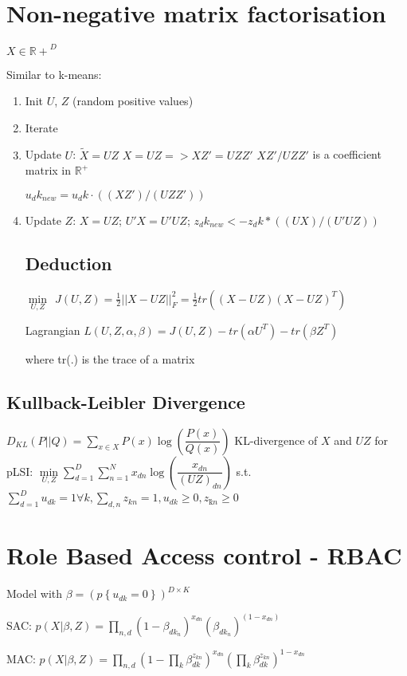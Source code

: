 \documentclass[11pt,twocolumn]{article}
\begin{document}
\section{Non-negative matrix factorisation}

$X \in \mathbb{R+}^{D}$ 
 
Similar to k-means:
\begin{enumerate}


\item Init $U$, $Z$ (random positive values)
\item Iterate
\item Update $U$:
$\tilde{X} = UZ$
$X = UZ => XZ' = UZZ'$
$XZ'/UZZ'$ is a coefficient matrix in $\mathbb{R^+}$ 


$u_dk_{new} = u_dk \cdot ( (XZ')/(UZZ') )$

\item Update $Z$: $X = UZ$;  $U'X = U'UZ$; $z_dk_{new} <- z_dk * ( (UX)/(U'UZ) )$

\subsection{Deduction}

${\min\limits_{U,Z}} ~~ J(U,Z) = \frac{1}{2} ||X-UZ||_F^2 = \frac{1}{2} tr\left( (X-UZ)(X-UZ)^T \right)$

Lagrangian $L(U,Z,\alpha, \beta)=J(U,Z)-tr(\alpha U^T) - tr(\beta Z^T)$

where tr(.) is the trace of a matrix

\end{enumerate}
\subsection{Kullback-Leibler Divergence}
$D_{KL}(P||Q) = \sum_{x \in X} P(x) \log \left( \dfrac{P(x)}{Q(x)}\right)$
KL-divergence of $X$ and $UZ$ for pLSI:
$\min\limits_{U,Z}\sum_{d=1}^D\sum_{n=1}^N x_{dn}\log\left(\dfrac{x_{dn}}{(UZ)_{dn}}\right)$ s.t. $ \sum_{d=1}^D u_{dk} =1 \forall k, \sum_{d,n}z_{kn}=1, u_{dk}\geq0,z_{ḱn}\geq0$
\section{Role Based Access control - RBAC}
Model with $\beta = (p\left\lbrace u_{dk}=0\right\rbrace)^{D \times K}$

SAC: $p(X|\beta,Z) = \prod\limits_{n,d}(1-\beta_{dk_n})^{x_{dn}}(\beta_{dk_n})^{(1-x_{dn})}$

MAC: $p(X|\beta,Z) = \prod\limits_{n,d}(1-\prod\limits_k \beta_{dk}^{z_{kn}})^{x_{dn}}(\prod\limits_k\beta_{dk}^{z_{kn}})^{1-x_{dn}}$
\end{document}
